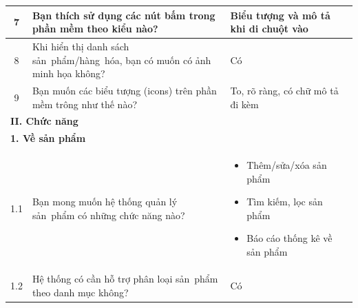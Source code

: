 \documentclass[a4paper,12pt]{report}
\begin{document}
\begin{longtable}{|c|p{8cm}|p{7cm}|}
    \hline
    7            & Bạn thích sử dụng các nút bấm trong phần mềm theo kiểu nào?                                                             & Biểu tượng và mô tả khi di chuột vào                                                                                     \\
    \hline
    8            & Khi hiển thị danh sách sản~phẩm/hàng~hóa, bạn có muốn có ảnh minh họa không?                                            & Có                                                                                                                       \\
    \hline
    9            & Bạn muốn các biểu tượng (icons) trên phần mềm trông như thế nào?                                                        & To, rõ ràng, có chữ mô tả đi kèm                                                                                         \\
    \hline
    \multicolumn{3}{|l|}{\textbf{II. Chức năng}}                                                                                                                                                                                                                      \\
    \hline
    \multicolumn{3}{|l|}{\textbf{1. Về sản phẩm}}                                                                                                                                                                                                                     \\
    \hline
    1.1          & Bạn mong muốn hệ thống quản lý sản~phẩm có những chức năng nào?                                                         &
    \begin{itemize}
        \item Thêm/sửa/xóa sản phẩm
        \item Tìm kiếm, lọc sản phẩm
        \item Báo cáo thống kê về sản phẩm
    \end{itemize}                                                                                                                                                                                                                                 \\
    \hline
    1.2          & Hệ thống có cần hỗ trợ phân loại sản~phẩm theo danh mục không?                                                          & Có                                                                                                                       \\

\end{longtable}
\end{document}
